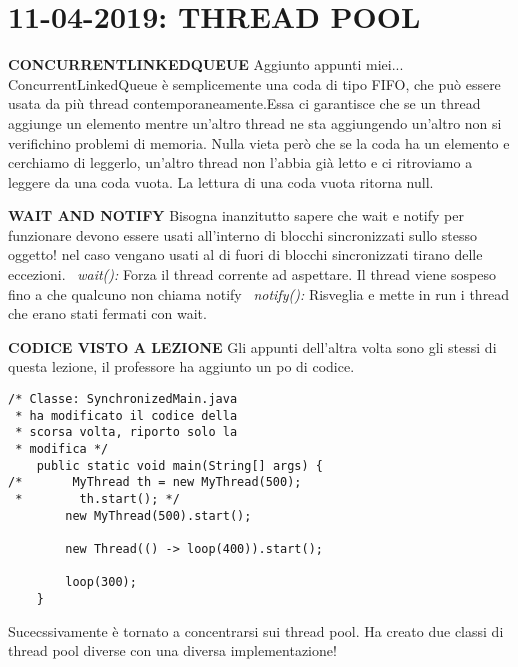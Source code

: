

\newpage
\section{11-04-2019: THREAD POOL}
\noindent \textbf{CONCURRENTLINKEDQUEUE} \newline
Aggiunto appunti miei... ConcurrentLinkedQueue è semplicemente una coda di tipo FIFO, che può essere usata da più thread contemporaneamente.Essa ci garantisce che se un thread aggiunge un elemento mentre un'altro thread ne sta aggiungendo un'altro non si verifichino problemi di memoria. Nulla vieta però che se la coda ha un elemento e cerchiamo di leggerlo, un'altro thread non l'abbia già letto e ci ritroviamo a leggere da una coda vuota. La lettura di una coda vuota ritorna null.

\noindent \textbf{WAIT AND NOTIFY} \newline
Bisogna inanzitutto sapere che wait e notify per funzionare devono essere usati all'interno di blocchi sincronizzati sullo stesso oggetto! nel caso vengano usati al di fuori di blocchi sincronizzati tirano delle eccezioni. \newline
\textbullet\ \textit{wait():} Forza il thread corrente ad aspettare. Il thread viene sospeso fino a che qualcuno non chiama notify \newline
\textbullet\ \textit{notify():} Risveglia e mette in run i thread che erano stati fermati con wait.

\noindent \textbf{CODICE VISTO A LEZIONE} \newline
\noindent Gli appunti dell'altra volta sono gli stessi di questa lezione, il professore ha aggiunto un po di codice.
 


\begin{lstlisting}
/* Classe: SynchronizedMain.java 
 * ha modificato il codice della 
 * scorsa volta, riporto solo la
 * modifica */
    public static void main(String[] args) {
/*       MyThread th = new MyThread(500);
 *        th.start(); */
        new MyThread(500).start();

        new Thread(() -> loop(400)).start();

        loop(300);
    }
\end{lstlisting}

\noindent Sucecssivamente è tornato a concentrarsi sui thread pool. \newline
Ha creato due classi di thread pool diverse con una diversa implementazione!

